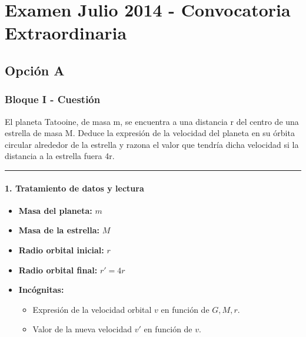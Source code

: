 \chapter{Examen Julio 2014 - Convocatoria Extraordinaria}
\label{chap:2014_jul_ext}

\section{Opción A}
\label{sec:A_2014_jul_ext}

\subsection{Bloque I - Cuestión}
\label{subsec:A1_2014_jul_ext}

\begin{cajaenunciado}
El planeta Tatooine, de masa m, se encuentra a una distancia r del centro de una estrella de masa M. Deduce la expresión de la velocidad del planeta en su órbita circular alrededor de la estrella y razona el valor que tendría dicha velocidad si la distancia a la estrella fuera 4r. 
\end{cajaenunciado}
\hrule

\subsubsection*{1. Tratamiento de datos y lectura}
\begin{itemize}
    \item \textbf{Masa del planeta:} $m$
    \item \textbf{Masa de la estrella:} $M$
    \item \textbf{Radio orbital inicial:} $r$
    \item \textbf{Radio orbital final:} $r' = 4r$
    \item \textbf{Incógnitas:}
        \begin{itemize}
            \item Expresión de la velocidad orbital $v$ en función de $G, M, r$.
            \item Valor de la nueva velocidad $v'$ en función de $v$.
        \end{itemize}
\end{itemize}

